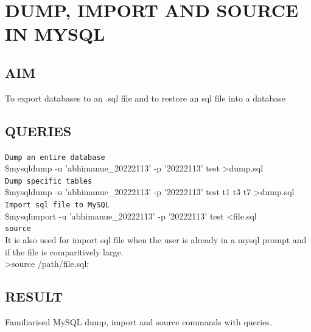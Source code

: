 \documentclass{article}
\begin{document}
\section{DUMP, IMPORT AND SOURCE IN MYSQL}
\hrulefill
\vspace{1cm}
\begin{flushleft}
\subsection{AIM}
To export databases to an .sql file and to restore an sql file into a database
\subsection{QUERIES}
\vspace{0.2in}\texttt{Dump an entire database}\\
\vspace{0.1in}
\hspace{0.1in} \$mysqldump -u 'abhimanue\_20222113' -p '20222113' test \textgreater dump.sql\\
\vspace{0.2in}\texttt{Dump specific tables}\\
\vspace{0.1in}\hspace{0.1in} \$mysqldump -u 'abhimanue\_20222113' -p '20222113' test t1 t3 t7 \textgreater dump.sql\\
\vspace{0.2in}\texttt{Import sql file to MySQL}\\
\vspace{0.1in}\hspace{0.1in} \$mysqlimport -u 'abhimanue\_20222113' -p '20222113' test \textless file.sql\\
\vspace{0.2in}\texttt{source}\\
\vspace{0.1in}It is also used for import sql file when the user is already in a mysql prompt and if the file is comparitively large.\\
\hspace{0.1in} \textgreater source /path/file.sql;
\subsection{RESULT}
Familiarised MySQL dump, import and source commands with queries.
\end{flushleft}
\end{document}
